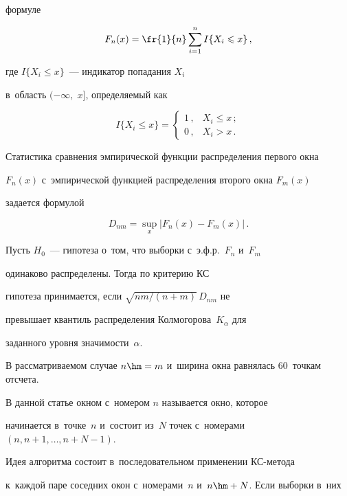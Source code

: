 формуле

$$

F_n(x)=\fr{1}{n}\sum\limits_{i=1}^n I \{X_i\leqslant x\}\,,

$$

где $I \{X_i\leqslant x\}$~--- индикатор попадания $X_i$ 

в~область $(-\infty,\;x]$, определяемый как

$$

I \{X_i\leqslant x\}=\begin{cases}

1\,, & X_i\leqslant x\,; \\ 

0\,, & X_i>x\,.

\end{cases}

$$



Статистика сравнения эмпирической функции распределения первого окна

$F_n(x)$ с~эмпирической функцией распределения второго окна $F_m(x)$

задается формулой

 $$

 D_{nm}=\sup\limits_x \left\vert F_n(x)-F_m(x)\right\vert \,.

 $$

Пусть $H_0$~--- гипотеза о~том, что выборки с~э.ф.р.~$F_n$ и~$F_m$

одинаково распределены. Тогда по критерию КС

гипотеза принимается, если $\sqrt{{nm}/(n+m)}\,D_{nm}$ не

превышает квантиль распределения Колмогорова~$K_{\alpha}$ для

заданного уровня значимости~$\alpha$.



В рассматриваемом случае $n\hm = m$ и~ширина окна равнялась 60~точкам отсчета.



В данной статье окном с~номером $n$  называется окно, которое

начинается в~точке~$n$ и~состоит из~$N$ точек с~номерами  $(n, n+1,

\ldots , n+N-1)$.



Идея алгоритма состоит в~последовательном применении КС-метода 

к~каждой паре соседних окон с~номерами~$n$ и~$n\hm+N$. Если выборки в~них


